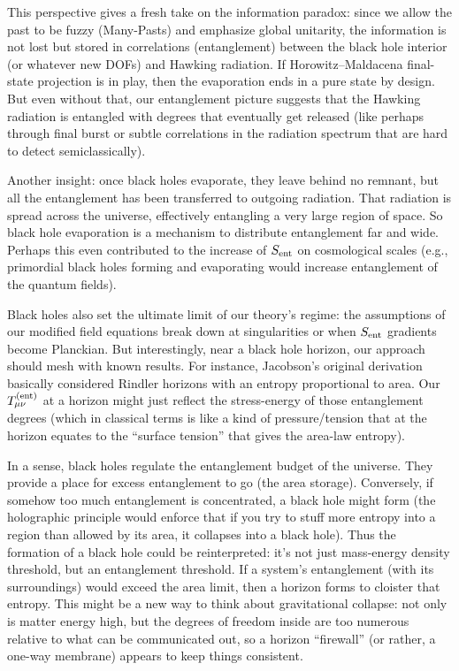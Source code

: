 \documentclass[11pt]{article}
\begin{document}
This perspective gives a fresh take on the information paradox: since we allow the past to be fuzzy (Many-Pasts) and emphasize global unitarity, the information is not lost but stored in correlations (entanglement) between the black hole interior (or whatever new DOFs) and Hawking radiation. If Horowitz–Maldacena final-state projection is in play, then the evaporation ends in a pure state by design​. But even without that, our entanglement picture suggests that the Hawking radiation is entangled with degrees that eventually get released (like perhaps through final burst or subtle correlations in the radiation spectrum that are hard to detect semiclassically).

Another insight: once black holes evaporate, they leave behind no remnant, but all the entanglement has been transferred to outgoing radiation. That radiation is spread across the universe, effectively entangling a very large region of space. So black hole evaporation is a mechanism to distribute entanglement far and wide. Perhaps this even contributed to the increase of $S_{\rm ent}$ on cosmological scales (e.g., primordial black holes forming and evaporating would increase entanglement of the quantum fields).

Black holes also set the ultimate limit of our theory’s regime: the assumptions of our modified field equations break down at singularities or when $S_{\rm ent}$ gradients become Planckian. But interestingly, near a black hole horizon, our approach should mesh with known results. For instance, Jacobson’s original derivation basically considered Rindler horizons with an entropy proportional to area. Our $T_{\mu\nu}^{\rm (ent)}$ at a horizon might just reflect the stress-energy of those entanglement degrees (which in classical terms is like a kind of pressure/tension that at the horizon equates to the “surface tension” that gives the area-law entropy).

In a sense, black holes regulate the entanglement budget of the universe. They provide a place for excess entanglement to go (the area storage). Conversely, if somehow too much entanglement is concentrated, a black hole might form (the holographic principle would enforce that if you try to stuff more entropy into a region than allowed by its area, it collapses into a black hole). Thus the formation of a black hole could be reinterpreted: it’s not just mass-energy density threshold, but an entanglement threshold. If a system’s entanglement (with its surroundings) would exceed the area limit, then a horizon forms to cloister that entropy. This might be a new way to think about gravitational collapse: not only is matter energy high, but the degrees of freedom inside are too numerous relative to what can be communicated out, so a horizon “firewall” (or rather, a one-way membrane) appears to keep things consistent.
\end{document}
